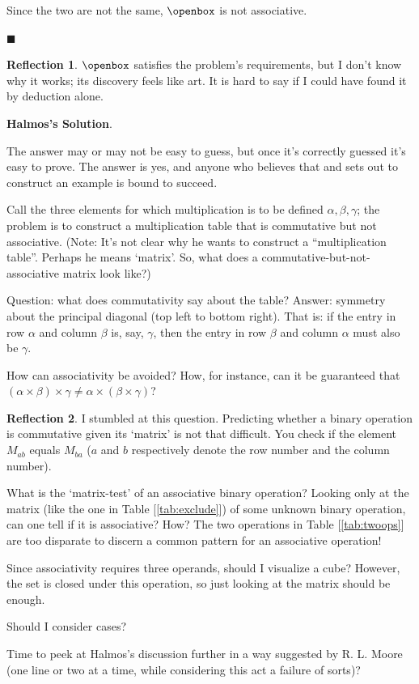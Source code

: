 \documentclass[english,notitlepage,smartquotes]{hgbreport}
\theoremstyle{definition}
\theoremstyle{definition}
\theoremstyle{remark}
\theoremstyle{plain}
\theoremstyle{definition}
\renewcommand\qedsymbol{$\blacksquare$}
\theoremstyle{definition}
\newtheorem{reflection}{Reflection}
\begin{document}
Since the two are not the same, $\openbox$ is not associative.

\qedsymbol

\begin{reflection}
$\openbox$ satisfies the problem's requirements, but I don't know why it works; its discovery feels like art. It is hard to say if I could have found it by deduction alone. 
\end{reflection}
\textbf{Halmos's Solution}.

The answer may or may not be easy to guess, but once it's correctly guessed it's easy to prove. The answer is yes, and anyone who believes that and sets out to construct an example is bound to succeed.

Call the three elements for which multiplication is to be defined $\alpha,\beta,\gamma$; the problem is to construct a multiplication table that is commutative but not associative. (Note: It's not clear why he wants to construct a ``multiplication table''. Perhaps he means `matrix'. So, what does a commutative-but-not-associative matrix look like?)

Question: what does commutativity say about the table? Answer: symmetry about the principal diagonal (top left to bottom right). That is: if the entry in row $\alpha$ and column $\beta$ is, say, $\gamma$, then the entry in row $\beta$ and column $\alpha$ must also be $\gamma$.

How can associativity be avoided? How, for instance, can it be guaranteed that $ (\alpha\times\beta)\times\gamma\ne\alpha\times(\beta\times\gamma)$?
\begin{reflection}
I stumbled at this question. Predicting whether a binary operation is commutative given its `matrix' is not that difficult. You check if the element $M_{ab}$ equals $M_{ba}$ ($a$ and $b$ respectively denote the row number and the column number).

What is the `matrix-test' of an associative binary operation? Looking only at the matrix (like the one in Table [\ref{tab:exclude}]) of some unknown binary operation, can one tell if it is associative? How? The two operations in Table [\ref{tab:twoops}] are too disparate to discern a common pattern for an associative operation!

Since associativity requires three operands, should I visualize a cube? However, the set is closed under this operation, so just looking at the matrix should be enough. 

Should I consider cases?

Time to peek at Halmos's discussion further in a way suggested by R. L. Moore \cite{Moore1966} (one line or two at a time, while considering this act a failure of sorts)?
\end{reflection}
\end{document}
